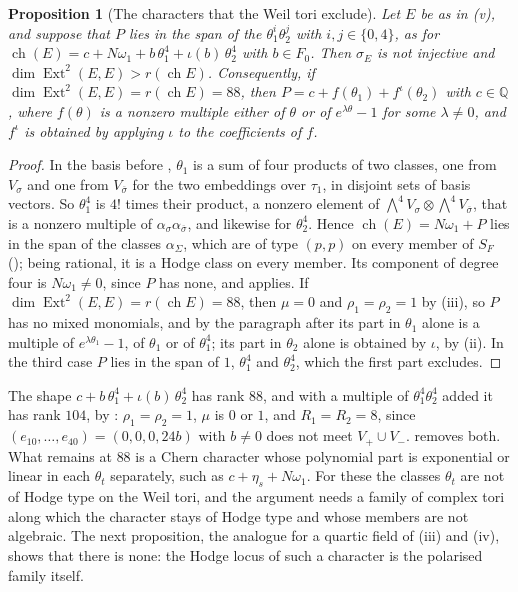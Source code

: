 \documentclass[11pt,reqno]{amsart}
\theoremstyle{plain}
\newtheorem{proposition}[theorem]{Proposition}
\theoremstyle{definition}
\theoremstyle{remark}
\newcommand{\QQ}{\mathbb{Q}}
\DeclareMathOperator{\ch}{ch}
\DeclareMathOperator{\Ext}{Ext}
\newcommand{\bbar}[1]{\overline{#1}}
\begin{document}
\begin{proposition}[The characters that the Weil tori exclude]
\label{prop:quarticweiltori}
Let $E$ be as in \textup{(v)}, and suppose that $P$
lies in the span of the $\theta_{1}^{i}\theta_{2}^{j}$ with
$i,j\in\{0,4\}$, as for $\ch(E)=c+N\omega_{1}+b\,\theta_{1}^{4}+
\iota(b)\,\theta_{2}^{4}$ with $b\in F_{0}$. Then $\sigma_{E}$ is not
injective and $\dim\Ext^{2}(E,E)>r(\ch E)$. Consequently, if
$\dim\Ext^{2}(E,E)=r(\ch E)=88$, then $P=c+f(\theta_{1})+f^{\iota}(\theta_{2})$
with $c\in\QQ$, where $f(\theta)$ is a nonzero multiple either of $\theta$ or
of $e^{\lambda\theta}-1$ for some $\lambda\ne0$, and $f^{\iota}$ is obtained
by applying $\iota$ to the coefficients of $f$.
\end{proposition}

\begin{proof}
In the basis before , $\theta_{1}$ is a sum of four
products of two classes, one from $V_{\sigma}$ and one from $V_{\bbar\sigma}$
for the two embeddings over $\tau_{1}$, in disjoint sets of basis vectors.
So $\theta_{1}^{4}$ is $4!$ times their product, a nonzero element of
$\bigwedge^{4}V_{\sigma}\otimes\bigwedge^{4}V_{\bbar\sigma}$, that is a
nonzero multiple of $\alpha_{\sigma}\alpha_{\bbar\sigma}$, and likewise for
$\theta_{2}^{4}$. Hence $\ch(E)=N\omega_{1}+P$ lies in the span of the
classes $\alpha_{\Sigma}$, which are of type $(p,p)$ on every member of
$S_{F}$ (); being rational, it is a Hodge class on
every member. Its component of degree four is $N\omega_{1}\ne0$, since $P$
has none, and  applies. If $\dim\Ext^{2}(E,E)=
r(\ch E)=88$, then $\mu=0$ and $\rho_{1}=\rho_{2}=1$ by
(iii), so $P$ has no mixed monomials, and by the
paragraph after  its part in $\theta_{1}$ alone is a
multiple of $e^{\lambda\theta_{1}}-1$, of $\theta_{1}$ or of $\theta_{1}^{4}$;
its part in $\theta_{2}$ alone is obtained by $\iota$, by
(ii). In the third case $P$ lies in the span of
$1$, $\theta_{1}^{4}$ and $\theta_{2}^{4}$, which the first part excludes.
\end{proof}

The shape $c+b\,\theta_{1}^{4}+\iota(b)\,\theta_{2}^{4}$ has rank $88$, and
with a multiple of $\theta_{1}^{4}\theta_{2}^{4}$ added it has rank $104$,
by : $\rho_{1}=\rho_{2}=1$, $\mu$ is $0$ or $1$, and
$R_{1}=R_{2}=8$, since $(e_{10},\dots,e_{40})=(0,0,0,24b)$ with $b\ne0$ does
not meet $V_{+}\cup V_{-}$.  removes
both. What remains at $88$ is a Chern character whose polynomial part is
exponential or linear in each $\theta_{t}$ separately, such as
$c+\eta_{s}+N\omega_{1}$. For these the classes $\theta_{t}$ are not of Hodge
type on the Weil tori, and the argument needs a family of complex tori along
which the character stays of Hodge type and whose members are not algebraic.
The next proposition, the analogue for a quartic field of
(iii) and (iv), shows that there is none: the Hodge
locus of such a character is the polarised family itself.
\end{document}
